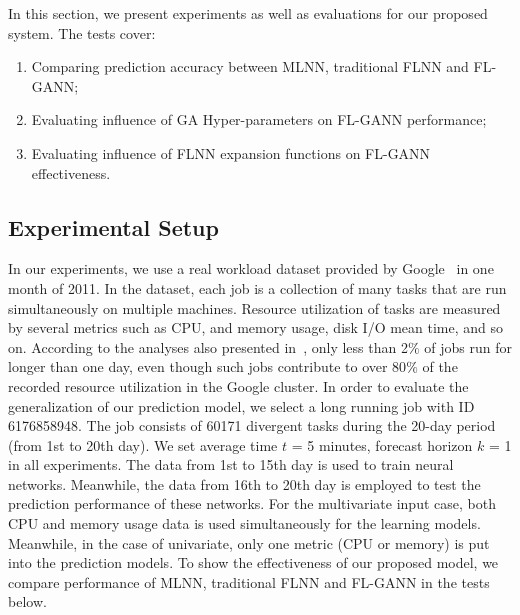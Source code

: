 \documentclass[conference]{IEEEtran}
\begin{document}
In this section, we present experiments as well as evaluations for our proposed system. The tests cover: 
\begin{enumerate}
	\item Comparing prediction accuracy between MLNN, traditional FLNN and FL-GANN;
	\item Evaluating influence of GA Hyper-parameters on FL-GANN performance;
	\item Evaluating influence of FLNN expansion functions on FL-GANN effectiveness. 
\end{enumerate}

\subsection{Experimental Setup}
\label{experimental_setup}

In our experiments, we use a real workload dataset provided by Google~\cite{ref_google_trace} in one month of 2011. In the dataset, each job is a collection of many tasks that are run simultaneously on multiple machines. Resource utilization of tasks are measured by several metrics such as CPU, and memory usage, disk I/O mean time, and so on. According to the analyses also presented in~\cite{ref_google_trace}, only less than 2$\%$ of jobs run for longer than one day, even though such jobs contribute to over 80$\%$ of the recorded resource utilization in the Google cluster. In order to evaluate the generalization of our prediction model, we select a long running job with ID 6176858948. The job consists of 60171 divergent tasks during the 20-day period (from 1st to 20th day). We set average time $t$ = 5 minutes, forecast horizon $k$ = 1 in all experiments. The data from 1st to 15th day is used to train neural networks. Meanwhile, the data from 16th to 20th day is employed to test the prediction performance of these networks. For the multivariate input case, both CPU and memory usage data is used simultaneously for the learning models. Meanwhile, in the case of univariate, only one metric (CPU or memory) is put into the prediction models. To show the effectiveness of our proposed model, we compare performance of MLNN, traditional FLNN and FL-GANN in the tests below.
\end{document}
